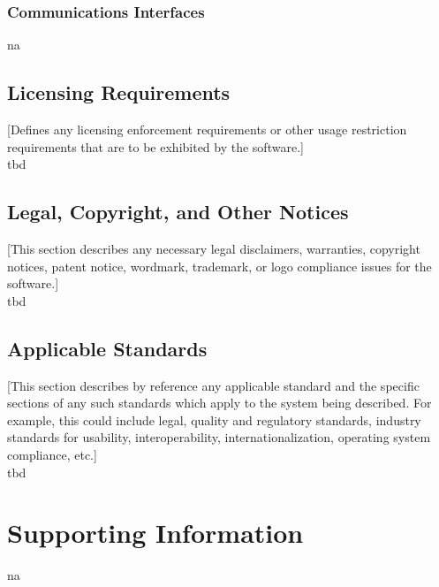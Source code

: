 \documentclass[a4paper,12pt,chapterprefix=false,bibliography=totoc,listof=totoc,]{scrreprt}
\begin{document}
\subsection{Communications Interfaces}
\gls{na}

\section{{\color{blue} Licensing Requirements}}
{\color{blue} [Defines any licensing enforcement requirements or other usage restriction requirements that are to be exhibited by the software.]}\\

\gls{tbd}

\section{{\color{blue} Legal, Copyright, and Other Notices}}
{\color{blue} [This section describes any necessary legal disclaimers, warranties, copyright notices, patent notice, wordmark, trademark, or logo compliance issues for the software.]}\\

\gls{tbd}

\section{{\color{blue} Applicable Standards}}
{\color{blue} [This section describes by reference any applicable standard and the specific sections of any such standards which apply to the system being described. For example, this could include legal, quality and regulatory standards, industry standards for usability, interoperability, internationalization, operating system compliance, etc.]}\\

\gls{tbd}

\chapter{Supporting Information}
\gls{na}
\end{document}
